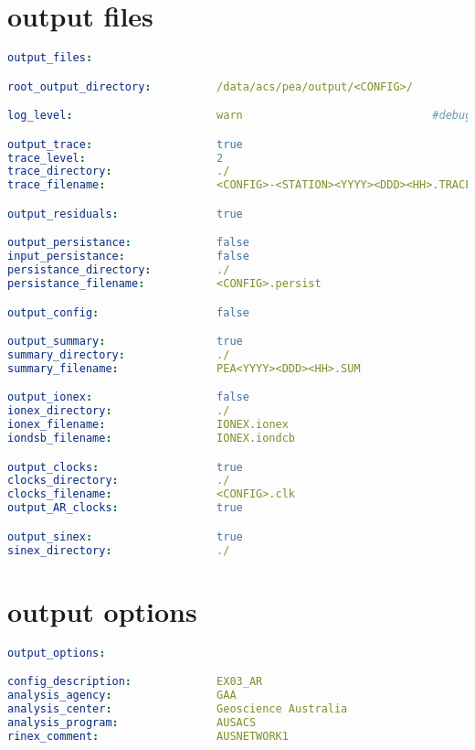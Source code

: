 \section{output files}
\begin{lstlisting}[language=yaml,caption=yaml input files configuration example]
output_files:

root_output_directory:          /data/acs/pea/output/<CONFIG>/

log_level:                      warn                             #debug, info, warn, error as defined in boost::log

output_trace:                   true
trace_level:                    2
trace_directory:                ./
trace_filename:                 <CONFIG>-<STATION><YYYY><DDD><HH>.TRACE

output_residuals:               true

output_persistance:             false
input_persistance:              false
persistance_directory:          ./
persistance_filename:           <CONFIG>.persist

output_config:                  false

output_summary:                 true
summary_directory:              ./
summary_filename:               PEA<YYYY><DDD><HH>.SUM

output_ionex:                   false
ionex_directory:                ./
ionex_filename:                 IONEX.ionex
iondsb_filename:                IONEX.iondcb

output_clocks:                  true
clocks_directory:               ./
clocks_filename:                <CONFIG>.clk
output_AR_clocks:               true

output_sinex:                   true
sinex_directory:                ./
\end{lstlisting}

\section{output options}

\begin{lstlisting}[language=yaml,caption=yaml input files configuration example]
output_options:

config_description:             EX03_AR
analysis_agency:                GAA
analysis_center:                Geoscience Australia
analysis_program:               AUSACS
rinex_comment:                  AUSNETWORK1
\end{lstlisting}

